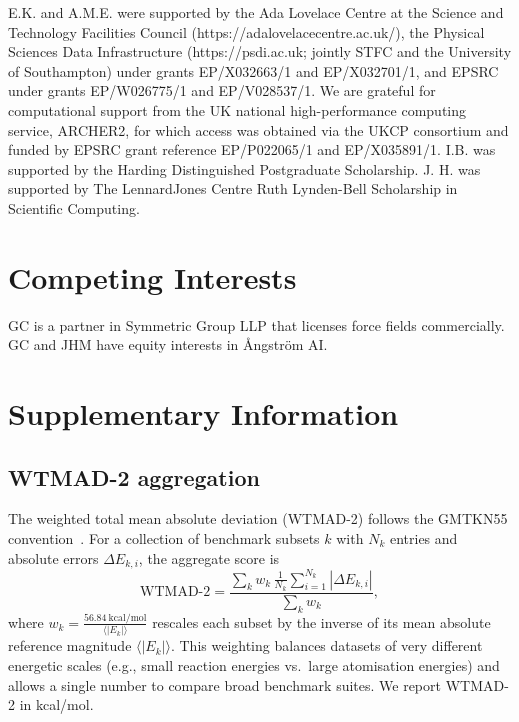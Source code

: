 \documentclass[aps,%
superscriptaddress,
 amsmath,amssymb,
floatfix,
twocolumn
]{revtex4-2}
\begin{document}
E.K. and A.M.E. were supported by the Ada Lovelace Centre at the Science and Technology Facilities Council (https://adalovelacecentre.ac.uk/), the Physical Sciences Data Infrastructure (https://psdi.ac.uk; jointly STFC and the University of Southampton) under grants EP/X032663/1 and EP/X032701/1, and EPSRC under grants EP/W026775/1 and EP/V028537/1.
We are grateful for computational
support from the UK national high-performance computing service, ARCHER2, for which access was obtained via the UKCP consortium and funded by EPSRC
grant reference EP/P022065/1 and EP/X035891/1.
I.B. was supported by the Harding Distinguished Postgraduate Scholarship. J. H. was supported by The LennardJones Centre Ruth Lynden-Bell Scholarship in Scientific Computing.

\section*{Competing Interests}

GC is a partner in Symmetric Group LLP that licenses force fields commercially. GC and JHM have equity interests in Ångström AI.


\clearpage



\clearpage
\onecolumngrid

\section{Supplementary Information}


\subsection{WTMAD-2 aggregation}
\label{sec:wtmad2}
The weighted total mean absolute deviation (WTMAD-2) follows the GMTKN55 convention~\cite{Goerigk2017}. For a collection of benchmark subsets $k$ with $N_k$ entries and absolute errors $\Delta E_{k,i}$, the aggregate score is
\begin{equation}
\mathrm{WTMAD\text{-}2} = \frac{\sum_k w_k \, \frac{1}{N_k}\sum_{i=1}^{N_k} |\Delta E_{k,i}|}{\sum_k w_k},
\end{equation}
where $w_k = \frac{56.84~\mathrm{kcal/mol}}{\langle |E_k|\rangle}$ rescales each subset by the inverse of its mean absolute reference magnitude $\langle |E_k|\rangle$. This weighting balances datasets of very different energetic scales (e.g., small reaction energies vs.\ large atomisation energies) and allows a single number to compare broad benchmark suites. We report WTMAD-2 in kcal/mol.
\end{document}
